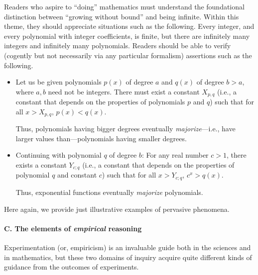 Readers who aspire to ``doing'' mathematics must understand the
foundational distinction between ``growing without bound'' and being
infinite.  Within this theme, they should appreciate situations such
as the following.  Every integer, and every polynomial with integer
coefficients, is finite, but there are infinitely many integers and
infinitely many polynomials.  Readers should be able to verify
(cogently but not necessarily via any particular formalism) assertions
such as the following.
\begin{itemize}
\item
Let us be given polynomials $p(x)$ of degree $a$ and $q(x)$ of degree
$b > a$, where $a, b$ need not be integers.  There must exist a
constant $X_{p,q}$ (i.e., a constant that depends on the properties of
polynomials $p$ and $q$) such that for all $x > X_{p,q}$, $p(x) <
q(x)$.

Thus, polynomials having bigger degrees eventually {\em
  majorize}---i.e., have larger values than---polynomials having
smaller degrees.

\item
Continuing with polynomial $q$ of degree $b$: For any real number $c >
1$, there exists a constant $Y_{c;q}$ (i.e., a constant that depends
on the properties of polynomial $q$ and constant $c$) such that for
all $x > Y_{c;q}$, $c^x > q(x)$.

Thus, exponential functions eventually {\em majorize} polynomials.
\end{itemize}
Here again, we provide just illustrative examples of pervasive
phenomena.

\medskip

\paragraph{C. The elements of {\em empirical} reasoning}

Experimentation (or, empiricism) is an invaluable guide both in the
sciences and in mathematics, but these two domains of inquiry acquire
quite different kinds of guidance from the outcomes of experiments.

